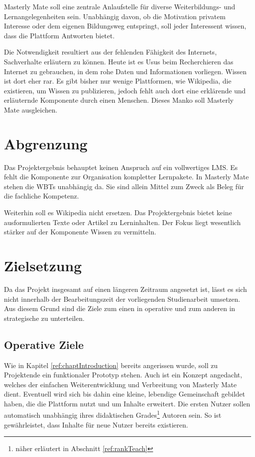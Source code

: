 Masterly Mate soll eine zentrale Anlaufstelle für diverse Weiterbildungs- und
Lernangelegenheiten sein. Unabhängig davon, ob die Motivation privatem Interesse
oder dem eigenen Bildungsweg entspringt, soll jeder Interessent wissen, dass
die Plattform Antworten bietet.

Die Notwendigkeit resultiert aus der fehlenden Fähigkeit des Internets,
Sachverhalte erläutern zu können. Heute ist es Usus beim Recherchieren das
Internet zu gebrauchen, in dem rohe Daten und Informationen vorliegen. Wissen
ist dort eher rar. Es gibt bisher nur wenige Plattformen, wie Wikipedia, die
existieren, um Wissen zu publizieren, jedoch fehlt auch dort eine erklärende und
erläuternde Komponente durch einen Menschen. Dieses Manko soll Masterly Mate
ausgleichen.

\section{Abgrenzung}
Das Projektergebnis behauptet keinen Anspruch auf ein vollwertiges \ac{LMS}. Es
fehlt die Komponente zur Organisation kompletter Lernpakete. In Masterly Mate
stehen die WBTs unabhängig da. Sie sind allein Mittel zum Zweck als Beleg für
die fachliche Kompetenz.

Weiterhin soll es Wikipedia nicht ersetzen. Das Projektergebnis bietet keine
ausformulierten Texte oder Artikel zu Lerninhalten. Der Fokus liegt wesentlich
stärker auf der Komponente Wissen zu vermitteln.

\section{Zielsetzung}
Da das Projekt insgesamt auf einen längeren Zeitraum angesetzt ist, lässt es
sich nicht innerhalb der Bearbeitungszeit der vorliegenden Studienarbeit
umsetzen. Aus diesem Grund sind die Ziele zum einen in operative und zum anderen
in strategische zu unterteilen. 

\subsection{Operative Ziele}
Wie in Kapitel \ref{ref:chaptIntroduction} bereits angerissen wurde, soll zu
Projektende ein funktionaler Prototyp stehen. Auch ist ein Konzept angedacht,
welches der einfachen Weiterentwicklung und Verbreitung von Masterly Mate dient.
Eventuell wird sich bis dahin eine kleine, lebendige Gemeinschaft gebildet
haben, die die Plattform nutzt und um Inhalte erweitert. Die ersten Nutzer
sollen automatisch unabhängig ihres didaktischen Grades\footnote{näher erläutert
in Abschnitt \ref{ref:rankTeach}} Autoren sein. So ist gewährleistet, dass
Inhalte für neue Nutzer bereits existieren.

